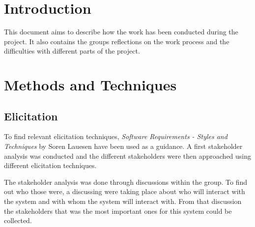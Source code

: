 \documentclass[10pt,a4paper]{article}
\begin{document}
\section{Introduction}
This document aims to describe how the work has been conducted during the project. It also contains the groups reflections on the work process and the difficulties with different parts of the project. 


\section{Methods and Techniques}




\subsection{Elicitation}
To find relevant elicitation techniques, \textit{Software Requirements - Styles and Techniques} by Soren Lauesen have been used as a guidance\cite{soren}. A first stakeholder analysis was conducted and the different stakeholders were then approached using different elicitation techniques.

The stakeholder analysis was done through discussions within the group. To find out who those were, a discussing were taking place about who will interact with the system and with whom the system will interact with. From that discussion the stakeholders that was the most important ones for this system could be collected.  
\end{document}
